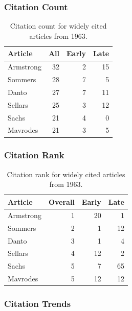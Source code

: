 \documentclass[
  10pt,
  letterpaper,
  DIV=11,
  numbers=noendperiod,
  twoside]{scrartcl}
\begin{document}
\subsubsection*{Citation Count}\label{sec-count-1963}

\begin{longtable}[]{@{}lrrr@{}}

\caption{\label{tbl-citation-count-1963}Citation count for widely cited
articles from 1963.}

\tabularnewline

\toprule\noalign{}
Article & All & Early & Late \\
\midrule\noalign{}
\endhead
\bottomrule\noalign{}
\endlastfoot
Armstrong & 32 & 2 & 15 \\
Sommers & 28 & 7 & 5 \\
Danto & 27 & 7 & 11 \\
Sellars & 25 & 3 & 12 \\
Sachs & 21 & 4 & 0 \\
Mavrodes & 21 & 3 & 5 \\

\end{longtable}

\subsubsection*{Citation Rank}\label{sec-rank-1963}

\begin{longtable}[]{@{}lrrr@{}}

\caption{\label{tbl-citation-rank-1963}Citation rank for widely cited
articles from 1963.}

\tabularnewline

\toprule\noalign{}
Article & Overall & Early & Late \\
\midrule\noalign{}
\endhead
\bottomrule\noalign{}
\endlastfoot
Armstrong & 1 & 20 & 1 \\
Sommers & 2 & 1 & 12 \\
Danto & 3 & 1 & 4 \\
Sellars & 4 & 12 & 2 \\
Sachs & 5 & 7 & 65 \\
Mavrodes & 5 & 12 & 12 \\

\end{longtable}

\subsubsection*{Citation Trends}\label{sec-trends-1963}
\end{document}
